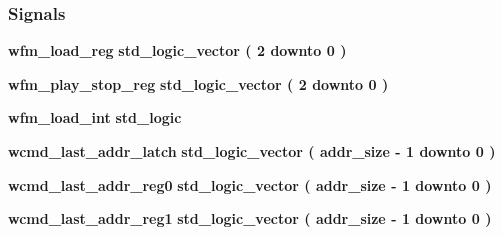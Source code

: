 \subsubsection*{Signals}
 \begin{DoxyCompactItemize}
\item 
{\bf wfm\+\_\+load\+\_\+reg} {\bfseries \textcolor{comment}{std\+\_\+logic\+\_\+vector}\textcolor{vhdlchar}{ }\textcolor{vhdlchar}{(}\textcolor{vhdlchar}{ }\textcolor{vhdlchar}{ } \textcolor{vhdldigit}{2} \textcolor{vhdlchar}{ }\textcolor{keywordflow}{downto}\textcolor{vhdlchar}{ }\textcolor{vhdlchar}{ } \textcolor{vhdldigit}{0} \textcolor{vhdlchar}{ }\textcolor{vhdlchar}{)}\textcolor{vhdlchar}{ }} 
\item 
{\bf wfm\+\_\+play\+\_\+stop\+\_\+reg} {\bfseries \textcolor{comment}{std\+\_\+logic\+\_\+vector}\textcolor{vhdlchar}{ }\textcolor{vhdlchar}{(}\textcolor{vhdlchar}{ }\textcolor{vhdlchar}{ } \textcolor{vhdldigit}{2} \textcolor{vhdlchar}{ }\textcolor{keywordflow}{downto}\textcolor{vhdlchar}{ }\textcolor{vhdlchar}{ } \textcolor{vhdldigit}{0} \textcolor{vhdlchar}{ }\textcolor{vhdlchar}{)}\textcolor{vhdlchar}{ }} 
\item 
{\bf wfm\+\_\+load\+\_\+int} {\bfseries \textcolor{comment}{std\+\_\+logic}\textcolor{vhdlchar}{ }} 
\item 
{\bf wcmd\+\_\+last\+\_\+addr\+\_\+latch} {\bfseries \textcolor{comment}{std\+\_\+logic\+\_\+vector}\textcolor{vhdlchar}{ }\textcolor{vhdlchar}{(}\textcolor{vhdlchar}{ }\textcolor{vhdlchar}{ }\textcolor{vhdlchar}{ }\textcolor{vhdlchar}{ }{\bfseries {\bf addr\+\_\+size}} \textcolor{vhdlchar}{-\/}\textcolor{vhdlchar}{ } \textcolor{vhdldigit}{1} \textcolor{vhdlchar}{ }\textcolor{keywordflow}{downto}\textcolor{vhdlchar}{ }\textcolor{vhdlchar}{ } \textcolor{vhdldigit}{0} \textcolor{vhdlchar}{ }\textcolor{vhdlchar}{)}\textcolor{vhdlchar}{ }} 
\item 
{\bf wcmd\+\_\+last\+\_\+addr\+\_\+reg0} {\bfseries \textcolor{comment}{std\+\_\+logic\+\_\+vector}\textcolor{vhdlchar}{ }\textcolor{vhdlchar}{(}\textcolor{vhdlchar}{ }\textcolor{vhdlchar}{ }\textcolor{vhdlchar}{ }\textcolor{vhdlchar}{ }{\bfseries {\bf addr\+\_\+size}} \textcolor{vhdlchar}{-\/}\textcolor{vhdlchar}{ } \textcolor{vhdldigit}{1} \textcolor{vhdlchar}{ }\textcolor{keywordflow}{downto}\textcolor{vhdlchar}{ }\textcolor{vhdlchar}{ } \textcolor{vhdldigit}{0} \textcolor{vhdlchar}{ }\textcolor{vhdlchar}{)}\textcolor{vhdlchar}{ }} 
\item 
{\bf wcmd\+\_\+last\+\_\+addr\+\_\+reg1} {\bfseries \textcolor{comment}{std\+\_\+logic\+\_\+vector}\textcolor{vhdlchar}{ }\textcolor{vhdlchar}{(}\textcolor{vhdlchar}{ }\textcolor{vhdlchar}{ }\textcolor{vhdlchar}{ }\textcolor{vhdlchar}{ }{\bfseries {\bf addr\+\_\+size}} \textcolor{vhdlchar}{-\/}\textcolor{vhdlchar}{ } \textcolor{vhdldigit}{1} \textcolor{vhdlchar}{ }\textcolor{keywordflow}{downto}\textcolor{vhdlchar}{ }\textcolor{vhdlchar}{ } \textcolor{vhdldigit}{0} \textcolor{vhdlchar}{ }\textcolor{vhdlchar}{)}\textcolor{vhdlchar}{ }} 

\end{DoxyCompactItemize}
